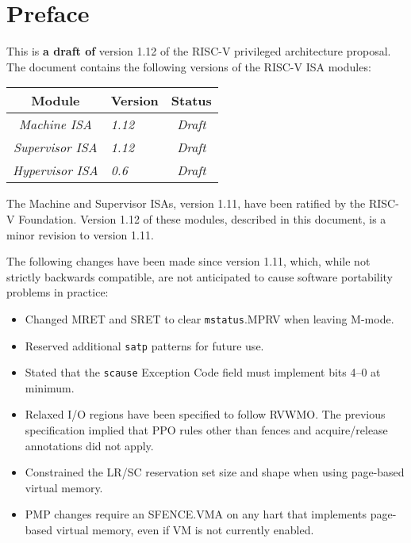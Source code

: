 \chapter{Preface}

This is {\bf a draft of} version 1.12 of the RISC-V privileged
architecture proposal.
The document contains the following versions of the RISC-V ISA
modules:

{
\begin{table}[hbt]
  \centering
  \begin{tabular}{|c|l|c|}
    \hline
    Module             & Version  & Status\\
    \hline
    \em Machine ISA    & \em 1.12 & \em Draft \\
    \em Supervisor ISA & \em 1.12 & \em Draft \\
    \em Hypervisor ISA & \em 0.6  & \em Draft \\
    \hline
  \end{tabular}
\end{table}
}

The Machine and Supervisor ISAs, version 1.11, have been ratified by
the RISC-V Foundation.  Version 1.12 of these modules, described in
this document, is a minor revision to version 1.11.

The following changes have been made since version 1.11, which, while not
strictly backwards compatible, are not anticipated to cause software
portability problems in practice:
\vspace{-0.2in}
\begin{itemize}
  \parskip 0pt
  \itemsep 1pt
\item Changed MRET and SRET to clear {\tt mstatus}.MPRV when leaving M-mode.
\item Reserved additional {\tt satp} patterns for future use.
\item Stated that the {\tt scause} Exception Code field must implement
  bits 4--0 at minimum.
\item Relaxed I/O regions have been specified to follow RVWMO.  The previous
  specification implied that PPO rules other than fences and acquire/release
  annotations did not apply.
\item Constrained the LR/SC reservation set size and shape when using
  page-based virtual memory.
\item PMP changes require an SFENCE.VMA on any hart that implements
  page-based virtual memory, even if VM is not currently enabled.
\end{itemize}

